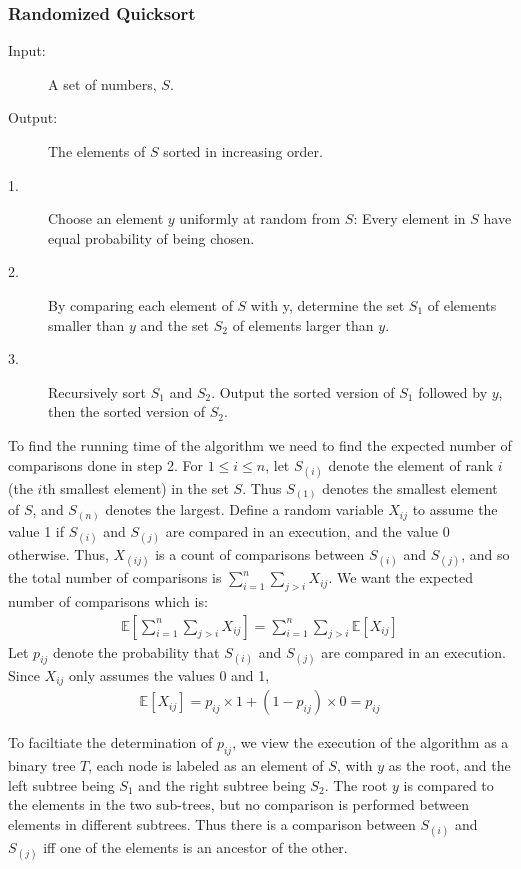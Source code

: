 \subsubsection{Randomized Quicksort}
\begin{description}
\item[Input:] A set of numbers, $S$.
\item[Output:] The elements of $S$ sorted in increasing order.
\item[1.] Choose an element $y$ uniformly at random from $S$: Every element in
  $S$ have equal probability of being chosen.
\item[2.] By comparing each element of $S$ with y, determine the set $S_1$ of
  elements smaller than $y$ and the set $S_2$ of elements larger than $y$.
\item[3.] Recursively sort $S_1$ and $S_2$. Output the sorted version of $S_1$
  followed by $y$, then the sorted version of $S_2$.
\end{description}

To find the running time of the algorithm we need to find the expected number of
comparisons done in step 2. For $1 \leq i \leq n$, let $S_{(i)}$ denote the
element of rank $i$ (the $i$th smallest element) in the set $S$.  Thus $S_{(1)}$
denotes the smallest element of $S$, and $S_{(n)}$ denotes the largest.  Define
a random variable $X_{ij}$ to assume the value 1 if $S_{(i)}$ and $S_{(j)}$ are
compared in an execution, and the value 0 otherwise.  Thus, $X_{(ij)}$ is a
count of comparisons between $S_{(i)}$ and $S_{(j)}$, and so the total number of
comparisons is $\sum^n_{i=1}\sum_{j>i} X_{ij}$. We want the expected number of
comparisons which is:
\begin{align}
\mathbb{E}[\sum^n_{i=1}\sum_{j>i} X_{ij}] = \sum^n_{i=1}\sum_{j>i}
\mathbb{E}[X_{ij}] \label{eq:rand1.2}
\end{align}
Let $p_{ij}$ denote the probability that $S_{(i)}$ and $S_{(j)}$ are compared in
an execution.  Since $X_{ij}$ only assumes the values 0 and 1,
\begin{align}
  \mathbb{E}[X_{ij}] = p_{ij} \times 1 + (1 - p_{ij}) \times 0 = p_{ij} \label{eq:rand1.3}
\end{align}

To faciltiate the determination of $p_{ij}$, we view the execution of the
algorithm as a binary tree $T$, each node is labeled as an element of $S$, with
$y$ as the root, and the left subtree being $S_1$ and the right subtree being
$S_2$.  The root $y$ is compared to the elements in the two sub-trees, but no
comparison is performed between elements in different subtrees.  Thus there is a
comparison between $S_{(i)}$ and $S_{(j)}$ iff one of the elements is an
ancestor of the other.

